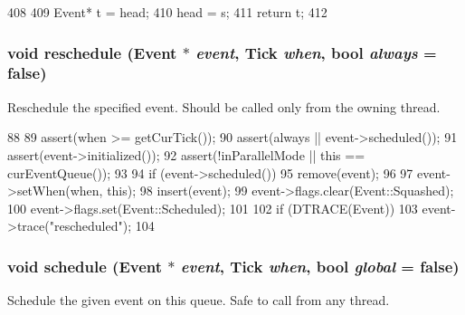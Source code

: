 \begin{DoxyCode}
408 {
409     Event* t = head;
410     head = s;
411     return t;
412 }
\end{DoxyCode}
\hypertarget{classEventQueue_a676294f5f01031f3dfdf956185390db8}{
\subsubsection[{reschedule}]{\setlength{\rightskip}{0pt plus 5cm}void reschedule ({\bf Event} $\ast$ {\em event}, \/  {\bf Tick} {\em when}, \/  bool {\em always} = {\ttfamily false})}}
\label{classEventQueue_a676294f5f01031f3dfdf956185390db8}
Reschedule the specified event. Should be called only from the owning thread. 


\begin{DoxyCode}
88 {
89     assert(when >= getCurTick());
90     assert(always || event->scheduled());
91     assert(event->initialized());
92     assert(!inParallelMode || this == curEventQueue());
93 
94     if (event->scheduled())
95         remove(event);
96 
97     event->setWhen(when, this);
98     insert(event);
99     event->flags.clear(Event::Squashed);
100     event->flags.set(Event::Scheduled);
101 
102     if (DTRACE(Event))
103         event->trace("rescheduled");
104 }
\end{DoxyCode}
\hypertarget{classEventQueue_a6e13c0d68fbc26df6eff27313813b8a4}{
\subsubsection[{schedule}]{\setlength{\rightskip}{0pt plus 5cm}void schedule ({\bf Event} $\ast$ {\em event}, \/  {\bf Tick} {\em when}, \/  bool {\em global} = {\ttfamily false})}}
\label{classEventQueue_a6e13c0d68fbc26df6eff27313813b8a4}
Schedule the given event on this queue. Safe to call from any thread. 


